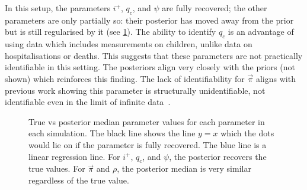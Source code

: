 \documentclass[thesis.tex]{subfiles}
\begin{document}
In this setup, the parameters $i^+$, $q_c$, and $\psi$ are fully recovered; the other parameters are only partially so: their posterior has moved away from the prior but is still regularised by it (see \cref{SEIR:fig:true-vs-posterior}).
The ability to identify $q_c$ is an advantage of using data which includes measurements on children, unlike data on hospitalisations or deaths.
This suggests that these parameters are not practically identifiable in this setting.
The posteriors align very closely with the priors (not shown) which reinforces this finding.
The lack of identifiability for $\vec{\pi}$ aligns with previous work showing this parameter is structurally unidentifiable, \ie not identifiable even in the limit of infinite data~\autocite{dankwaStructural}.
\begin{figure}
    \caption[True vs posterior parameter values]{%
        True vs posterior median parameter values for each parameter in each simulation.
        The black line shows the line $y = x$ which the dots would lie on if the parameter is fully recovered.
        The blue line is a linear regression line.
        For $i^+$, $q_c$, and $\psi$, the posterior recovers the true values.
        For $\vec{\pi}$ and $\rho$, the posterior median is very similar regardless of the true value.
    }
    \label{SEIR:fig:true-vs-posterior}
\end{figure}
\end{document}
